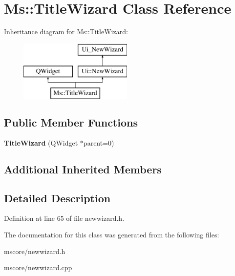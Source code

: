 \hypertarget{class_ms_1_1_title_wizard}{}\section{Ms\+:\+:Title\+Wizard Class Reference}
\label{class_ms_1_1_title_wizard}
Inheritance diagram for Ms\+:\+:Title\+Wizard\+:\begin{figure}[H]
\begin{center}
\leavevmode
\includegraphics[height=3.000000cm]{class_ms_1_1_title_wizard}
\end{center}
\end{figure}
\subsection*{Public Member Functions}
\begin{DoxyCompactItemize}
\item 
\mbox{\label{class_ms_1_1_title_wizard_a2854c88cb0252f0552f121cc1a7ce9ad}} 
{\bfseries Title\+Wizard} (Q\+Widget $\ast$parent=0)
\end{DoxyCompactItemize}
\subsection*{Additional Inherited Members}


\subsection{Detailed Description}


Definition at line 65 of file newwizard.\+h.



The documentation for this class was generated from the following files\+:\begin{DoxyCompactItemize}
\item 
mscore/newwizard.\+h\item 
mscore/newwizard.\+cpp\end{DoxyCompactItemize}

